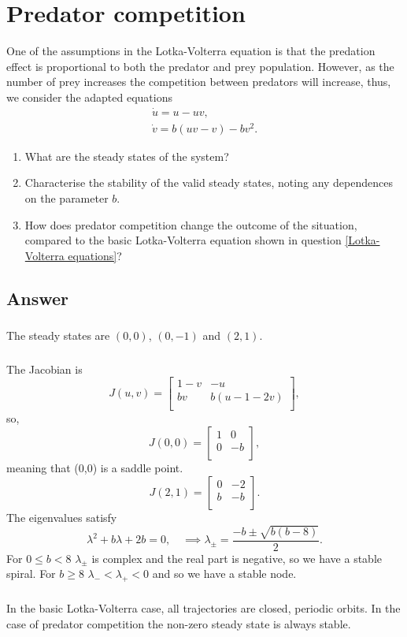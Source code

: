 \documentclass[]{article}
\newcommand{\bb}{\begin{equation}}
\newcommand{\ee}{\end{equation}}
\begin{document}
\section{Predator competition}
One of the assumptions in the Lotka-Volterra equation is that the predation effect is proportional to both the predator and prey population. However, as the number of prey increases the  competition between predators will increase, thus, we consider the adapted equations
\begin{align}
\dot{u}=u-uv,\\
\dot{v}=b(uv-v)-bv^2.
\end{align}
\begin{enumerate}
\item What are the steady states of the system?
\item Characterise the stability of the valid steady states, noting any dependences on the parameter $b$.
\item How does predator competition change the outcome of the situation, compared to the basic Lotka-Volterra equation shown in question \ref{Lotka-Volterra equations}?
\end{enumerate}
\begin{Answ}
\subsection{Answer}
\subsubsection{}
The steady states are $(0,0)$, $(0,-1)$ and $(2,1)$.
\subsubsection{}
The Jacobian is
\bb
J(u,v)=\left[ {\begin{array}{cc}
   1-v & -u \\
   bv & b(u-1-2v) \\
  \end{array} } \right],
\ee
so, 
\bb
J(0,0)=\left[ {\begin{array}{cc}
   1 & 0 \\
   0 & -b \\
  \end{array} } \right],
\ee
meaning that (0,0) is a saddle point.
\bb
J(2,1)=\left[ {\begin{array}{cc}
   0 & -2 \\
   b & -b \\
  \end{array} } \right].
\ee
The eigenvalues satisfy
\bb
\lambda^2+b\lambda+2b=0,\quad\implies\lambda_\pm=\frac{-b\pm\sqrt{b(b-8)}}{2}.
\ee
For $0\leq b < 8$ $\lambda_\pm$ is complex and the real part is negative, so we have a stable spiral. For $b\geq 8$ $\lambda_-<\lambda_+<0$ and so we have a stable node.
\subsubsection{}
In the basic Lotka-Volterra case, all trajectories are closed, periodic orbits. In the case of predator competition the non-zero steady state is always stable.
\end{Answ}
\end{document}
